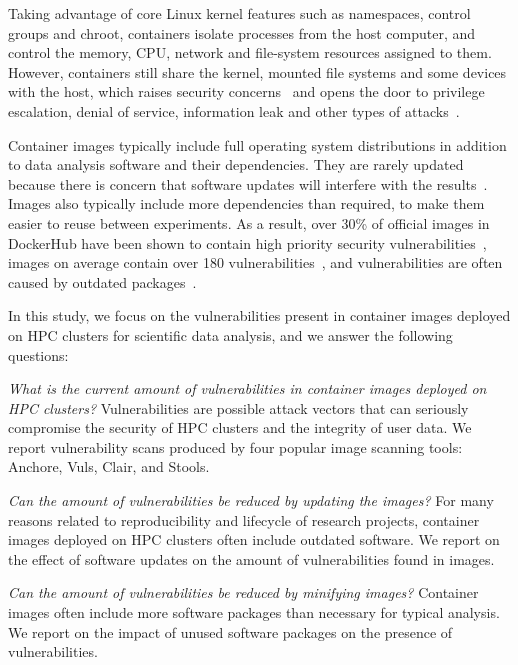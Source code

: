 \documentclass[a4paper,num-refs]{oup-contemporary}
\begin{document}
Taking advantage of core Linux kernel features such as namespaces, control
groups and chroot, containers isolate processes from the host computer, and
control the memory, CPU, network and file-system resources assigned to
them. However, containers still share the kernel, mounted file systems and
some devices with the host, which raises security
concerns~\cite{martin2018docker, sultan2019container, combe2016docker} and
opens the door to privilege escalation, denial of service, information leak
and other types of attacks~\cite{gantikow2016providing}. 

Container images typically include full operating system distributions in
addition to data analysis software and their dependencies. They are rarely
updated because there is concern that software updates will interfere with
the results~\cite{gronenschild2012effects, glatard2015reproducibility}.
Images also typically include more dependencies than required, to make them
easier to reuse between experiments. As a result, over 30\% of official
images in DockerHub have been shown to contain high priority security
vulnerabilities~\cite{gummaraju2015over}, images on average contain over
180 vulnerabilities~\cite{Shu2017}, and vulnerabilities are often caused by
outdated packages~\cite{zerouali2019relation}.

In this study, we focus on the vulnerabilities present in container images
deployed on HPC clusters for scientific data analysis, and we answer the
following questions:

\textit{What is the current amount of vulnerabilities in
container images deployed on HPC clusters?} Vulnerabilities are possible
attack vectors that can seriously compromise the security of HPC clusters
and the integrity of user data. We report vulnerability scans produced
by four popular image scanning tools: Anchore, Vuls, Clair, and Stools.

\textit{Can the amount of vulnerabilities be reduced by updating the images?}  
For many reasons related to reproducibility and lifecycle of research
projects, container images deployed on HPC clusters often include outdated
software. We report on the effect of software updates on the amount of
vulnerabilities found in images.

\textit{Can the amount of vulnerabilities be reduced by minifying images?} 
Container images often include more software packages than necessary for 
typical analysis. We report on the impact of unused software packages on
the presence of vulnerabilities.
\end{document}
